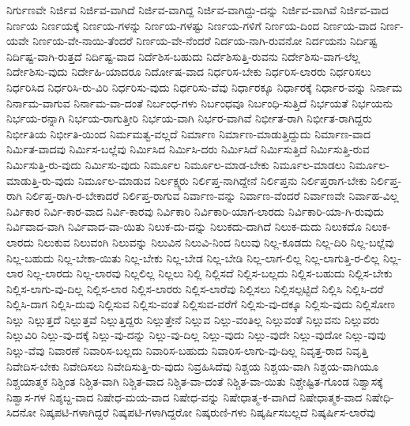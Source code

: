 {ನಿರ್ಗುಣವೇ
ನಿರ್ಜಿವ
ನಿರ್ಜಿವ-ವಾಗಿದೆ
ನಿರ್ಜಿವ-ವಾಗಿದ್ದ
ನಿರ್ಜಿವ-ವಾಗಿದ್ದು-ದನ್ನು
ನಿರ್ಜಿವ-ವಾಗಿವೆ
ನಿರ್ಜಿವ-ವಾದ
ನಿರ್ಣಯ
ನಿರ್ಣಯಕ್ಕೆ
ನಿರ್ಣಯ-ಗಳನ್ನು
ನಿರ್ಣಯ-ಗಳಷ್ಟು
ನಿರ್ಣಯ-ಗಳಿಗೆ
ನಿರ್ಣಯ-ದಿಂದ
ನಿರ್ಣಯ-ವಾದ
ನಿರ್ಣ-ಯವೇ
ನಿರ್ಣಯ-ವೇ-ನಾಯಿ-ತೆಂದರೆ
ನಿರ್ಣಯ-ವೇ-ನೆಂದರೆ
ನಿರ್ದಯ-ನಾಗಿ-ರುವನೋ
ನಿರ್ದಯನು
ನಿರ್ದಿಷ್ಟ
ನಿರ್ದಿಷ್ಟ-ವಾಗಿ-ರುತ್ತದೆ
ನಿರ್ದಿಷ್ಟ-ವಾದ
ನಿರ್ದೆಶಿಸ-ಬಹುದು
ನಿರ್ದೆಶಿಸುತ್ತಿ-ರುವನು
ನಿರ್ದೇಶಿಸು-ವಾಗ-ಲೆಲ್ಲ
ನಿರ್ದೇಶಿಸು-ವುದು
ನಿರ್ದೇಹಿ-ಯಾದರೂ
ನಿರ್ದೋಷ-ವಾದ
ನಿರ್ಧರಿಸ-ಬೇಕು
ನಿರ್ಧರಿಸ-ಲಾರರು
ನಿರ್ಧರಿಸಲು
ನಿರ್ಧರಿಸಿದ
ನಿರ್ಧರಿಸಿ-ರು-ವಿರಿ
ನಿರ್ಧರಿಸು-ವುದು
ನಿರ್ಧರಿಸು-ವೆವು
ನಿರ್ಧಾರಕ್ಕೂ
ನಿರ್ಧಾರಕ್ಕೆ
ನಿರ್ಧಾರ-ವನ್ನು
ನಿರ್ನಾಮ
ನಿರ್ನಾಮ-ವಾಗುವ
ನಿರ್ನಾಮ-ವಾ-ದಂತೆ
ನಿರ್ಬಂಧ-ಗಳು
ನಿರ್ಬಂಧವೂ
ನಿರ್ಬಂಧಿ-ಸುತ್ತಿದೆ
ನಿರ್ಭಯತೆ
ನಿರ್ಭಯನು
ನಿರ್ಭಯ-ರನ್ನಾಗಿ
ನಿರ್ಭಯ-ರಾಗುತ್ತೀರಿ
ನಿರ್ಭಯ-ವಾಗಿ
ನಿರ್ಭರ-ವಾಗಿವೆ
ನಿರ್ಭೀತ-ರಾಗಿ
ನಿರ್ಭೀತ-ರಾಗಿದ್ದರು
ನಿರ್ಭೀತಿಯ
ನಿರ್ಭೀತಿ-ಯಿಂದ
ನಿರ್ಮಮತ್ವ-ವಲ್ಲದೆ
ನಿರ್ಮಾಣ
ನಿರ್ಮಾಣ-ಮಾಡುತ್ತಿದ್ದುದು
ನಿರ್ಮಾಣ-ವಾದ
ನಿರ್ಮಿತ-ವಾದವು
ನಿರ್ಮಿಸ-ಬಲ್ಲೆವು
ನಿರ್ಮಿಸಿದ
ನಿರ್ಮಿಸಿ-ದರು
ನಿರ್ಮಿಸಿದೆ
ನಿರ್ಮಿಸುತ್ತಿದೆ
ನಿರ್ಮಿಸುತ್ತಿ-ರುವ
ನಿರ್ಮಿಸುತ್ತಿ-ರು-ವುದು
ನಿರ್ಮಿಸು-ವುದು
ನಿರ್ಮೂಲ
ನಿರ್ಮೂಲ-ಮಾಡ-ಬೇಕು
ನಿರ್ಮೂಲ-ಮಾಡಲು
ನಿರ್ಮೂಲ-ಮಾಡುತ್ತಿ-ರು-ವುದು
ನಿರ್ಮೂಲ-ಮಾಡುವ
ನಿರ್ಲಕ್ಷ್ಯರು
ನಿರ್ಲಿಪ್ತ-ನಾಗಿದ್ದೇನೆ
ನಿರ್ಲಿಪ್ತನು
ನಿರ್ಲಿಪ್ತರಾಗ-ಬೇಕು
ನಿರ್ಲಿಪ್ತ-ರಾಗಿ
ನಿರ್ಲಿಪ್ತ-ರಾಗಿ-ರ-ಬೇಕಾದರೆ
ನಿರ್ಲಿಪ್ತ-ರಾಗುವ
ನಿರ್ವಾಣ-ವನ್ನು
ನಿರ್ವಾಣ-ವೆಂದರೆ
ನಿರ್ವಾಣವೇ
ನಿರ್ವಾಹ-ವಿಲ್ಲ
ನಿರ್ವಿಕಾರ
ನಿರ್ವಿ-ಕಾರ-ವಾದ
ನಿರ್ವಿ-ಕಾರವು
ನಿರ್ವಿಕಾರಿ
ನಿರ್ವಿಕಾರಿ-ಯಾಗ-ಲಾರದು
ನಿರ್ವಿಕಾರಿ-ಯಾ-ಗಿ-ರುವುದು
ನಿರ್ವಿವಾದ-ವಾಗಿ
ನಿರ್ವಿವಾದ-ವಾ-ಯಿತು
ನಿಲುಕ-ದು-ದನ್ನು
ನಿಲುಕದು-ದಾಗಿದೆ
ನಿಲುಕ-ದುದು
ನಿಲುಕದೊ
ನಿಲುಕ-ಲಾರದು
ನಿಲುಕುವ
ನಿಲುವಂಗಿ
ನಿಲುವನ್ನು
ನಿಲುವಿನ
ನಿಲುವಿ-ನಿಂದ
ನಿಲುವು
ನಿಲ್ಲ-ಕೂಡದು
ನಿಲ್ಲ-ದಿರಿ
ನಿಲ್ಲ-ಬಲ್ಲೆವು
ನಿಲ್ಲ-ಬಹುದು
ನಿಲ್ಲ-ಬೇಕಾ-ಯಿತು
ನಿಲ್ಲ-ಬೇಕು
ನಿಲ್ಲ-ಬೇಡ
ನಿಲ್ಲ-ಬೇಡಿ
ನಿಲ್ಲ-ಲಾಗ-ಲಿಲ್ಲ
ನಿಲ್ಲ-ಲಾಗುತ್ತಿ-ರ-ಲಿಲ್ಲ
ನಿಲ್ಲ-ಲಾರ
ನಿಲ್ಲ-ಲಾರದು
ನಿಲ್ಲ-ಲಾರವು
ನಿಲ್ಲಲಿಲ್ಲ
ನಿಲ್ಲಲು
ನಿಲ್ಲಿ
ನಿಲ್ಲಿಸದೆ
ನಿಲ್ಲಿಸ-ಬಲ್ಲದು
ನಿಲ್ಲಿಸ-ಬಹುದು
ನಿಲ್ಲಿಸ-ಬೇಕು
ನಿಲ್ಲಿಸ-ಲಾಗು-ವು-ದಿಲ್ಲ
ನಿಲ್ಲಿಸ-ಲಾರ
ನಿಲ್ಲಿಸ-ಲಾರರು
ನಿಲ್ಲಿಸ-ಲಾರೆವು
ನಿಲ್ಲಿಸಲು
ನಿಲ್ಲಿಸಲ್ಪಟ್ಟಿದೆ
ನಿಲ್ಲಿಸಿ
ನಿಲ್ಲಿಸಿ-ದರೆ
ನಿಲ್ಲಿಸಿ-ದಾಗ
ನಿಲ್ಲಿಸಿ-ದುವು
ನಿಲ್ಲಿಸುವ
ನಿಲ್ಲಿಸು-ವಂತೆ
ನಿಲ್ಲಿಸುವ-ವರೆಗೆ
ನಿಲ್ಲಿಸು-ವು-ದಕ್ಕೂ
ನಿಲ್ಲಿಸು-ವುದು
ನಿಲ್ಲಿಸೋಣ
ನಿಲ್ಲು
ನಿಲ್ಲುತ್ತದೆ
ನಿಲ್ಲುತ್ತವೆ
ನಿಲ್ಲುತ್ತಿದ್ದರು
ನಿಲ್ಲುತ್ತೇನೆ
ನಿಲ್ಲುವ
ನಿಲ್ಲು-ವಂತಿಲ್ಲ
ನಿಲ್ಲುವಂತೆ
ನಿಲ್ಲುವನು
ನಿಲ್ಲುವರು
ನಿಲ್ಲುವಿರಿ
ನಿಲ್ಲು-ವು-ದಕ್ಕೆ
ನಿಲ್ಲು-ವು-ದನ್ನು
ನಿಲ್ಲು-ವು-ದಿಲ್ಲ
ನಿಲ್ಲು-ವುದು
ನಿಲ್ಲು-ವುದೇ
ನಿಲ್ಲು-ವುದೋ
ನಿಲ್ಲು-ವುವು
ನಿಲ್ಲು-ವೆವು
ನಿವಾರಣೆ
ನಿವಾರಿಸ-ಬಲ್ಲದು
ನಿವಾರಿಸ-ಬಹುದು
ನಿವಾರಿಸ-ಲಾಗು-ವು-ದಿಲ್ಲ
ನಿವೃತ್ತ-ರಾದ
ನಿವೃತ್ತಿ
ನಿವೇದಿಸ-ಬೇಕು
ನಿವೇದಿಸಲು
ನಿವೇದಿಸುತ್ತಿ-ರು-ವುದು
ನಿವ್ರಹಿಸಿದೆವು
ನಿಶ್ಚಯ
ನಿಶ್ಚಯ-ವಾಗಿ
ನಿಶ್ಚಯ-ವಾಗಿಯೂ
ನಿಶ್ಚಯಾತ್ಮಕ
ನಿಶ್ಚಿಂತ
ನಿಶ್ಚಿತ-ವಾಗಿ
ನಿಶ್ಚಿತ-ವಾದ
ನಿಶ್ಚಿತ-ವಾ-ದಂತೆ
ನಿಶ್ಚಿತ-ವಾ-ಯಿತು
ನಿಶ್ಚೇಷ್ಟಿತ-ಗೊಂಡ
ನಿಶ್ವಾಸಕ್ಕೆ
ನಿಶ್ವಾಸ-ಗಳ
ನಿಶ್ಶಬ್ದ-ವಾದ
ನಿಷೇಧ-ಮಯ-ವಾದ
ನಿಷೇಧ-ವನ್ನು
ನಿಷೇಧಾತ್ಮ-ಕ-ವಾಗಿದೆ
ನಿಷೇಧಾತ್ಮಕ-ವಾದ
ನಿಷೇಧಿ-ಸಿದನೋ
ನಿಷ್ಕಪಟಿ-ಗಳಾಗಿದ್ದರೆ
ನಿಷ್ಕಪಟಿ-ಗಳಾಗಿದ್ದರೋ
ನಿಷ್ಕರುಣಿ-ಗಳು
ನಿಷ್ಕರ್ಷಿಸಬಲ್ಲದೆ
ನಿಷ್ಕರ್ಷಿಸ-ಲಾರೆವು
}
